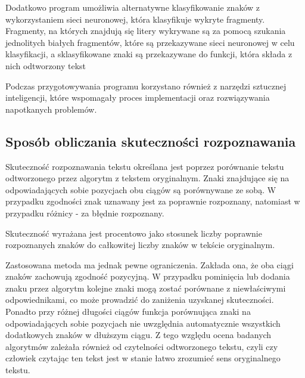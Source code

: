 \documentclass{article}
\begin{document}
Dodatkowo program umożliwia alternatywne klasyfikowanie znaków z wykorzystaniem sieci neuronowej, która klasyfikuje wykryte fragmenty. Fragmenty, na których znajdują się litery wykrywane są za pomocą szukania jednolitych białych fragmentów, które są przekazywane sieci neuronowej w celu klasyfikacji, a sklasyfikowane znaki są przekazywane do funkcji, która składa z nich odtworzony tekst

Podczas przygotowywania programu korzystano również z narzędzi sztucznej inteligencji, które wspomagały proces implementacji oraz rozwiązywania napotkanych problemów.

\subsection{Sposób obliczania skuteczności rozpoznawania}
Skuteczność rozpoznawania tekstu określana jest poprzez porównanie tekstu odtworzonego przez algorytm z tekstem oryginalnym. Znaki znajdujące się na odpowiadających sobie pozycjach obu ciągów są porównywane ze sobą. W przypadku zgodności znak uznawany jest za poprawnie rozpoznany, natomiast w przypadku różnicy - za błędnie rozpoznany.

Skuteczność wyrażana jest procentowo jako stosunek liczby poprawnie rozpoznanych znaków do całkowitej liczby znaków w tekście oryginalnym.

Zastosowana metoda ma jednak pewne ograniczenia. Zakłada ona, że oba ciągi znaków zachowują zgodność pozycyjną. W przypadku pominięcia lub dodania znaku przez algorytm kolejne znaki mogą zostać porównane z niewłaściwymi odpowiednikami, co może prowadzić do zaniżenia uzyskanej skuteczności. Ponadto przy różnej długości ciągów funkcja porównująca znaki na odpowiadających sobie pozycjach nie uwzględnia automatycznie wszystkich dodatkowych znaków w dłuższym ciągu. Z tego względu ocena badanych algorytmów zależała również od czytelności odtworzonego tekstu, czyli czy człowiek czytając ten tekst jest w stanie łatwo zrozumieć sens oryginalnego tekstu.

\clearpage
\end{document}
